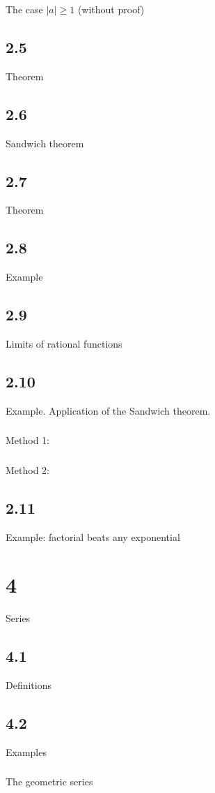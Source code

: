 \subsubsection{}{The case $|a|\geq 1$ (without proof)}
\subsection{2.5}{Theorem}
\subsection{2.6}{Sandwich theorem}
\subsection{2.7}{Theorem}
\subsection{2.8}{Example}
\subsection{2.9}{Limits of rational functions}
\subsection{2.10}{Example. Application of the Sandwich theorem. }
\subsubsection{}{Method 1: }
\subsubsection{}{Method 2: }
\subsection{2.11}{Example: factorial beats any exponential}

\section{4}{Series}
\subsection{4.1}{Definitions}
\subsection{4.2}{Examples}
\subsubsection{}{The geometric series}
